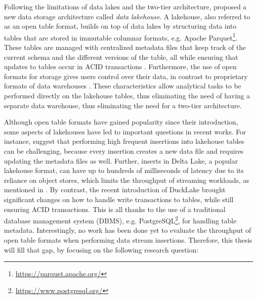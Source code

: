 Following the limitations of data lakes and the two-tier architecture, \citeauthor{michael_armbrust_lakehouse_2021} \cite{michael_armbrust_lakehouse_2021} proposed a new data storage architecture called \textit{data lakehouse}. A lakehouse, also referred to as an open table format, builds on top of data lakes by structuring data into tables that are stored in immutable columnar formats, e.g. Apache Parquet\footnote{\url{https://parquet.apache.org/}}. These tables are managed with centralized metadata files that keep track of the current schema and the different versions of the table, all while ensuring that updates to tables occur in ACID \cite{haerderPrinciplesTransactionorientedDatabase1983} transactions \cite{michael_armbrust_lakehouse_2021}. Furthermore, the use of open formats for storage gives users control over their data, in contrast to proprietary formats of data warehouses \cite{michael_armbrust_lakehouse_2021, schneider_lakehouse_2024, avrilayshaDeltaLakeVs}. These characteristics allow analytical tasks to be performed directly on the lakehouse tables, thus eliminating the need of having a separate data warehouse, thus eliminating the need for a two-tier architecture.

Although open table formats have gained popularity since their introduction, some aspects of lakehouses have led to important questions in recent works. For instance, \citeauthor{paras_jain_analyzing_2023} \cite{paras_jain_analyzing_2023} suggest that performing high frequent insertions into lakehouse tables can be challenging, because every insertion creates a new data file and requires updating the metadata files as well. Further, inserts in Delta Lake, a popular lakehouse format, can have up to hundreds of milliseconds of latency due to its reliance on object stores, which limits the throughput of streaming workloads, as mentioned in \cite{armbrust_delta_2020}. By contrast, the recent introduction of DuckLake \cite{mark_raasveldt_ducklake_2025} brought significant changes on how to handle write transactions to tables, while still ensuring ACID transactions. This is all thanks to the use of a traditional database management system (DBMS), e.g. PostgreSQL\footnote{\url{https://www.postgresql.org/}}, for handling table metadata. Interestingly, no work has been done yet to evaluate the throughput of open table formats when performing data stream insertions. Therefore, this thesis will fill that gap, by focusing on the following research question:

